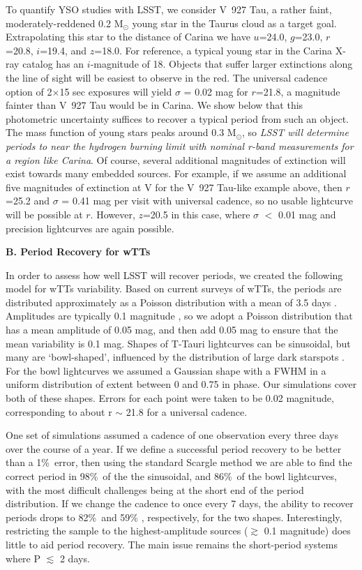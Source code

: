 To quantify YSO studies with LSST, we consider V~927 Tau,
a rather faint, moderately-reddened 0.2 M$_\odot$ young star in the Taurus cloud
as a target goal. Extrapolating this star
to the distance of Carina we have $u$=24.0, $g$=23.0, $r$=20.8, $i$=19.4, and $z$=18.0. For reference,
a typical young star in the Carina X-ray catalog has an $i$-magnitude of 18.
Objects that suffer larger extinctions along the line of sight will
be easiest to observe in the red. The universal cadence option of 2$\times$15 sec
exposures will yield $\sigma$ = 0.02 mag for $r$=21.8, a magnitude fainter than
V~927 Tau would be in Carina. We show below that this photometric uncertainty
suffices to recover a typical period from such an object. The mass function
of young stars peaks around 0.3 M$_\odot$, so {\it LSST will
determine periods to near the hydrogen burning limit with nominal r-band measurements
for a region like Carina}. Of course, several additional magnitudes of extinction will
exist towards many embedded sources. For example, if we assume an additional five magnitudes
of extinction at V for the V~927 Tau-like example above,
then $r$=25.2 and $\sigma$ = 0.41 mag per visit with universal cadence,
so no usable lightcurve will be possible at $r$.
However, $z$=20.5 in this case, where $\sigma$ $<$ 0.01 mag and precision
lightcurves are again possible.

{\bf B. Period Recovery for wTTs}

In order to assess how well LSST will recover periods, we created the following
model for wTTs variability.  Based on current surveys of wTTs, the periods are
distributed approximately as a Poisson distribution with a mean of 3.5 days
\citep{Affer13}.
Amplitudes are typically 0.1 magnitude \citep{Grankin2008},
so we adopt a Poisson distribution
that has a mean amplitude of 0.05 mag, and then add 0.05 mag to ensure that
the mean variability is 0.1 mag. Shapes of T-Tauri lightcurves can be sinusoidal,
but many are `bowl-shaped', influenced by the distribution of large dark starspots
\citep{Alencar2010}.
For the bowl lightcurves we assumed a Gaussian shape with a FWHM in a uniform
distribution of extent between 0 and 0.75 in phase.
Our simulations cover both of these shapes.
Errors for each point were taken to be 0.02 magnitude, corresponding to
about r $\sim$ 21.8 for a universal cadence.

One set of simulations assumed a cadence of
one observation every three days over the course of a year.
If we define a successful period recovery to be better than a 1\%\ error, then
using the standard Scargle method \citep{Horne1986}
we are able to find the correct period in
98\%\ of the the sinusoidal, and 86\%\ of the bowl lightcurves, with the most
difficult challenges being at the short end of the period distribution. If we change
the cadence to once every 7 days, the ability to recover periods drops to
82\%\ and 59\% , respectively, for the two shapes. Interestingly, restricting the
sample to the highest-amplitude sources ($\gtrsim$ 0.1 magnitude) does little
to aid period recovery. The main issue remains the short-period systems where
P $\lesssim$ 2 days.

